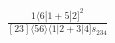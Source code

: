 \documentclass[varwidth, border=5pt]{standalone}
\begin{document}
\begin{my}
$\begin{gathered}
\scriptscriptstyle\frac{1⟨6|1+5|2]^2}{[23]⟨56⟩⟨1|2+3|4]s_{234}}
\end{gathered}$
\end{my}
\end{document}
